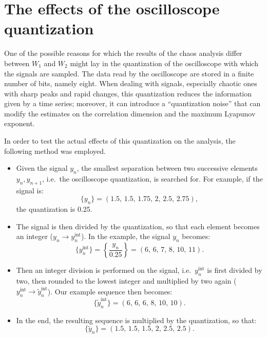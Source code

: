 \section{The effects of the oscilloscope quantization}\label{sec: oscilloscope quantization}

One of the possible reasons for which the results of the chaos analysis differ between $W_1$ and $W_2$
might lay in the quantization of the oscilloscope with which the signals are sampled.
The data read by the oscilloscope are stored in a finite number of bits, namely eight.
When dealing with signals, especially chaotic ones with sharp peaks and rapid changes,
this quantization reduces the information given by a time series; moreover, it can introduce
a ``quantization noise'' that can modify the estimates on the correlation dimension and the maximum
Lyapunov exponent.

In order to test the actual effects of this quantization on the analysis, the following method was
employed.
\begin{itemize}
    \item
    Given the signal $y_n$, the smallest separation between two successive elements
    $y_n,y_{n+1}$, i.e.\ the oscilloscope quantization, is searched for.
    For example, if the signal is:
    \begin{equation*}
        \{y_n\}=(1.5,\,1.5,\,1.75,\,2,\,2.5,\,2.75),
    \end{equation*}
    the quantization is 0.25.

    \item
    The signal is then divided by the quantization, so that each element becomes an integer
    ($y_n\rightarrow y_n^{\text{int}}$).
    In the example, the signal $y_n$ becomes:
    \begin{equation*}
        \{y_n^{\text{int}}\}=\left\{\frac{y_n}{0.25}\right\}=(6,\,6,\,7,\,8,\,10,\,11).
    \end{equation*}

    \item
    Then an integer division is performed on the signal, i.e.\ $y_n^{\text{int}}$ is first divided
    by two, then rounded to the lowest integer and multiplied by two again
    ($y_n^{\text{int}}\rightarrow \tilde{y}_n^{\text{int}}$).
    Our example sequence then becomes:
    \begin{equation*}
        \{\tilde{y}_n^{\text{int}}\}=(6,\,6,\,6,\,8,\,10,\,10).
    \end{equation*}

    \item
    In the end, the resulting sequence is multiplied by the quantization, so that:
    \begin{equation*}
        \{\tilde{y}_n\}=(1.5,\,1.5,\,1.5,\,2,\,2.5,\,2.5).
    \end{equation*}
\end{itemize}

